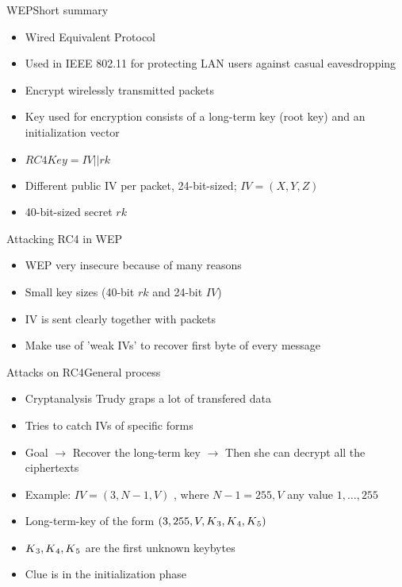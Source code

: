 \documentclass[
	aspectratio=169,	%
	onlytextwidth,		%
	t,					%
	]{beamer}
\begin{document}
\begin{frame}[fragile]{WEP}{Short summary}
	\begin{itemize}
		\item Wired Equivalent Protocol
		\item Used in IEEE 802.11 for protecting LAN users against casual eavesdropping
		\item Encrypt wirelessly transmitted packets
		\item Key used for encryption consists of a long-term key (root key) and an initialization vector
		\item $RC4Key = IV||rk$
		\item Different public IV per packet, 24-bit-sized; $IV=(X,Y,Z)$
		\item 40-bit-sized secret $rk$
	\end{itemize}
\end{frame}

\begin{frame}[fragile]{Attacking RC4 in WEP}
	\begin{itemize}
		\item WEP very insecure because of many reasons
		\item Small key sizes (40-bit $rk$ and 24-bit $IV$) \cite{stovsic2012rc4}
		\item IV is sent clearly together with packets
		\item Make use of 'weak IVs' to recover first byte of every message
	\end{itemize}
\end{frame}

\begin{frame}[fragile]{Attacks on RC4}{General process}
	\begin{itemize}
		\item Cryptanalysis Trudy graps a lot of transfered data
		\item Tries to catch IVs of specific forms 
		\item Goal $\rightarrow$ Recover the long-term key $\rightarrow$ Then she can decrypt all the ciphertexts
		\item Example: $ IV = (3, N-1, V)$ , where $N-1 = 255, V$ any value ${1,\dots,255}$
		\item Long-term-key of the form $(3, 255, V, K\textsubscript{3}, K\textsubscript{4},K\textsubscript{5})$
		\item $K\textsubscript{3}, K\textsubscript{4},K\textsubscript{5}$ are the first unknown keybytes
		\item Clue is in the initialization phase
	\end{itemize}
\end{frame}
\end{document}
